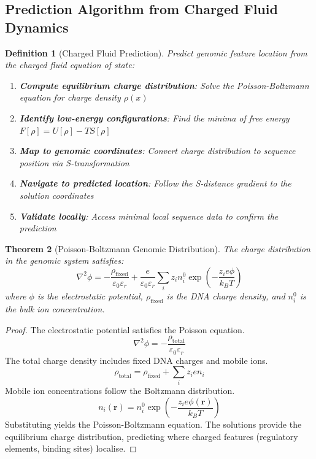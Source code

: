 \documentclass[11pt,a4paper]{article}
\newtheorem{theorem}{Theorem}[section]
\newtheorem{definition}[theorem]{Definition}
\theoremstyle{remark}
\begin{document}
\subsection{Prediction Algorithm from Charged Fluid Dynamics}

\begin{definition}[Charged Fluid Prediction]
\label{def:charged_fluid_prediction}
Predict genomic feature location from the charged fluid equation of state:
\begin{enumerate}
\item \textbf{Compute equilibrium charge distribution}: Solve the Poisson-Boltzmann equation for charge density $\rho(x)$
\item \textbf{Identify low-energy configurations}: Find the minima of free energy $F[\rho] = U[\rho] - TS[\rho]$
\item \textbf{Map to genomic coordinates}: Convert charge distribution to sequence position via S-transformation
\item \textbf{Navigate to predicted location}: Follow the S-distance gradient to the solution coordinates
\item \textbf{Validate locally}: Access minimal local sequence data to confirm the prediction
\end{enumerate}
\end{definition}

\begin{theorem}[Poisson-Boltzmann Genomic Distribution]
\label{thm:poisson_boltzmann_genome}
The charge distribution in the genomic system satisfies:
\begin{equation}
\nabla^2\phi = -\frac{\rho_{\text{fixed}}}{\varepsilon_0\varepsilon_r} + \frac{e}{\varepsilon_0\varepsilon_r}\sum_i z_i n_i^0 \exp\left(-\frac{z_i e\phi}{k_BT}\right)
\end{equation}
where $\phi$ is the electrostatic potential, $\rho_{\text{fixed}}$ is the DNA charge density, and $n_i^0$ is the bulk ion concentration.
\end{theorem}

\begin{proof}
The electrostatic potential satisfies the Poisson equation.
\begin{equation}
\nabla^2\phi = -\frac{\rho_{\text{total}}}{\varepsilon_0\varepsilon_r}
\end{equation}
The total charge density includes fixed DNA charges and mobile ions.
\begin{equation}
\rho_{\text{total}} = \rho_{\text{fixed}} + \sum_i z_i e n_i
\end{equation}
Mobile ion concentrations follow the Boltzmann distribution.
\begin{equation}
n_i(\mathbf{r}) = n_i^0 \exp\left(-\frac{z_i e\phi(\mathbf{r})}{k_BT}\right)
\end{equation}
Substituting yields the Poisson-Boltzmann equation. The solutions provide the equilibrium charge distribution, predicting where charged features (regulatory elements, binding sites) localise.
\end{proof}
\end{document}
